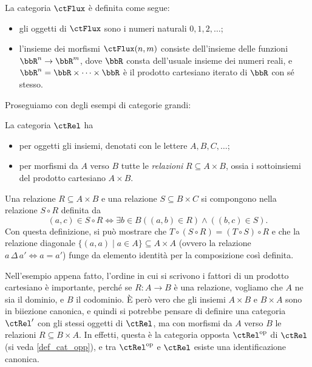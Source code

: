 \begin{example}\label{ex_cat_flusso}
	La categoria \(\ctFlux\) è definita come segue:
	\begin{itemize}
		\item gli oggetti di \(\ctFlux\) sono i numeri naturali \(0,1,2,\dots\);
		\item l'insieme dei morfismi \(\ctFlux(n,m)\) consiste dell'insieme delle funzioni \(\bbR^n\to \bbR^m\), dove \(\bbR\) consta dell'usuale insieme dei numeri reali, e \(\bbR^n = \bbR\times\dots\times\bbR\) è il prodotto cartesiano iterato di \(\bbR\) con sé stesso.
	\end{itemize}
\end{example}
Proseguiamo con degli esempi di categorie grandi:
\begin{example}\label{ex_cat_rels}
	La categoria \(\ctRel\) ha
	\begin{itemize}
		\item per oggetti gli insiemi, denotati con le lettere \(A,B,C,\dots\);
		\item per morfismi da \(A\) verso \(B\) tutte le \emph{relazioni} \(R\subseteq A\times B\), ossia i sottoinsiemi del prodotto cartesiano \(A\times B\).
	\end{itemize}
	Una relazione \(R\subseteq A\times B\) e una relazione \(S\subseteq B\times C\) si compongono nella relazione \(S\circ R\) definita da
	\[(a,c)\in S\circ R\iff \exists b\in B ((a,b)\in R)\land ((b,c)\in S).\]
	Con questa definizione, si può mostrare che \(T\circ(S\circ R)=(T\circ S)\circ R\) e che la relazione diagonale \(\{(a,a)\mid a\in A\}\subseteq A\times A\) (ovvero la relazione \(a\,\Delta\,a'\iff a=a'\)) funge da elemento identità per la composizione così definita.
\end{example}
Nell'esempio appena fatto, l'ordine in cui si scrivono i fattori di un prodotto cartesiano è importante, perché se \(R : A\to B\) è una relazione, vogliamo che \(A\) ne sia il dominio, e \(B\) il codominio. \`E però vero che gli insiemi \(A\times B\) e \(B\times A\) sono in biiezione canonica, e quindi si potrebbe pensare di definire una categoria \(\ctRel'\) con gli stessi oggetti di \(\ctRel\), ma con morfismi da \(A\) verso \(B\) le relazioni \(R\subseteq B\times A\). In effetti, questa è la categoria opposta \(\ctRel^\op\) di \(\ctRel\) (si veda \ref{def_cat_opp}), e tra \(\ctRel^\op\) e \(\ctRel\) esiste una identificazione canonica.

